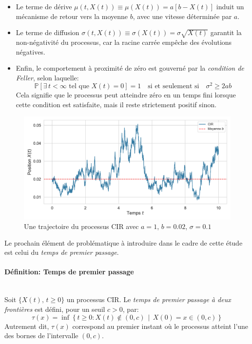 \begin{itemize}
    \item Le terme de dérive $\mu(t, X(t)) \equiv \mu(X(t))= a[b - X(t)]$ induit un mécanisme de retour vers la moyenne $b$, avec une vitesse déterminée par $a$.
    \item Le terme de diffusion $\sigma(t, X(t))\equiv \sigma(X(t)) = \sigma \sqrt{X(t)}$ garantit la non-négativité du processus, car la racine carrée empêche des évolutions négatives.
    \item Enfin, le comportement à proximité de zéro est gouverné par la \textit{condition de Feller}, selon laquelle:
    \[
    \mathds{P} \left[ \exists\, t < \infty \text{ tel que } X(t) = 0 \right] = 1 \quad \text{si et seulement si} \quad \sigma^2 \geq 2ab
    \]
    Cela signifie que le processus peut atteindre zéro en un temps fini lorsque cette condition est satisfaite, mais il reste strictement positif sinon.
\end{itemize}
\begin{figure}[htb]
    \centering
    \includegraphics[width=\linewidth]{img/intro/path_cir.pdf}
    \caption{Une trajectoire du processus \acs{CIR} avec $a=1$, $b=0.02$, $\sigma=0.1$}\label{fig:TrajCIR}
\end{figure}
\FloatBarrier

Le prochain élément de problématique à introduire dans le cadre de cette étude est celui du \textit{temps de premier passage}.

\paragraph{Définition: Temps de premier passage}\mbox{}\\
Soit $\{X(t),\, t \geq 0\}$ un processus \acs{CIR}. Le \textit{temps de premier passage à deux frontières} est défini, pour un seuil $c > 0$, par:
\begin{equation}\label{fpt_definition}
    \tau(x) = \inf \left\{ t \geq 0: X(t) \notin (0, c) \,\middle|\, X(0) = x \in (0, c) \right\}
\end{equation}
Autrement dit, $\tau(x)$ correspond au premier instant où le processus atteint l'une des bornes de l'intervalle $(0, c)$. \\

